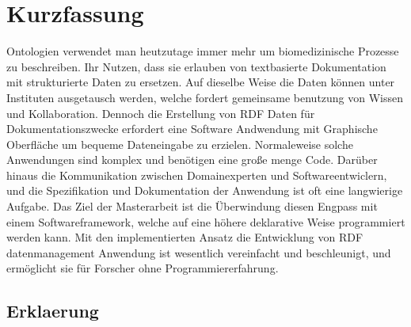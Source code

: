 \chapter*{Kurzfassung}

Ontologien verwendet man heutzutage immer mehr um biomedizinische Prozesse zu beschreiben. Ihr Nutzen, dass sie erlauben von textbasierte Dokumentation mit strukturierte Daten zu ersetzen. Auf dieselbe Weise die Daten können unter Instituten ausgetausch werden, welche fordert gemeinsame benutzung von Wissen und Kollaboration. Dennoch die Erstellung von RDF Daten für Dokumentationszwecke erfordert eine Software Andwendung mit Graphische Oberfläche um bequeme Dateneingabe zu erzielen. Normaleweise solche Anwendungen sind komplex und benötigen eine große menge Code. Darüber hinaus die Kommunikation zwischen Domainexperten und Softwareentwiclern, und die Spezifikation und Dokumentation der Anwendung ist oft eine langwierige Aufgabe. Das Ziel der Masterarbeit ist die Überwindung diesen Engpass mit einem Softwareframework, welche auf eine höhere deklarative Weise programmiert werden kann. Mit den implementierten Ansatz die Entwicklung von RDF datenmanagement Anwendung ist wesentlich vereinfacht und beschleunigt, und ermöglicht sie für Forscher ohne Programmiererfahrung. 

\linespread{1.25}\selectfont

\tableofcontents %
\listoffigures  %
\blankpage
\blankpage






%

\blankpage


\pagestyle{empty}
\newpage
\section*{Erklaerung}

